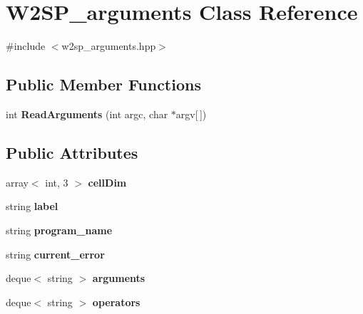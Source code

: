 \hypertarget{class_w2_s_p__arguments}{}\section{W2\+S\+P\+\_\+arguments Class Reference}
\label{class_w2_s_p__arguments}


{\ttfamily \#include $<$w2sp\+\_\+arguments.\+hpp$>$}

\subsection*{Public Member Functions}
\begin{DoxyCompactItemize}
\item 
int {\bfseries Read\+Arguments} (int argc, char $\ast$argv\mbox{[}$\,$\mbox{]})\hypertarget{class_w2_s_p__arguments_afe339aa7b9ece593138992383d0d7df2}{}\label{class_w2_s_p__arguments_afe339aa7b9ece593138992383d0d7df2}

\end{DoxyCompactItemize}
\subsection*{Public Attributes}
\begin{DoxyCompactItemize}
\item 
array$<$ int, 3 $>$ {\bfseries cell\+Dim}\hypertarget{class_w2_s_p__arguments_a46d91dbcde18e388672e5587bdb0e243}{}\label{class_w2_s_p__arguments_a46d91dbcde18e388672e5587bdb0e243}

\item 
string {\bfseries label}\hypertarget{class_w2_s_p__arguments_a8033248c369be266bec4f668264bf183}{}\label{class_w2_s_p__arguments_a8033248c369be266bec4f668264bf183}

\item 
string {\bfseries program\+\_\+name}\hypertarget{class_w2_s_p__arguments_a92f67e03c019035d66f6d74d592e121d}{}\label{class_w2_s_p__arguments_a92f67e03c019035d66f6d74d592e121d}

\item 
string {\bfseries current\+\_\+error}\hypertarget{class_w2_s_p__arguments_aa327835490b77458d1157f8a83b05ec3}{}\label{class_w2_s_p__arguments_aa327835490b77458d1157f8a83b05ec3}

\item 
deque$<$ string $>$ {\bfseries arguments}\hypertarget{class_w2_s_p__arguments_a95f44f50a04111000da2a893731d2437}{}\label{class_w2_s_p__arguments_a95f44f50a04111000da2a893731d2437}

\item 
deque$<$ string $>$ {\bfseries operators}\hypertarget{class_w2_s_p__arguments_a0ee2f27ace415c94334bc5a0211bd4ec}{}\label{class_w2_s_p__arguments_a0ee2f27ace415c94334bc5a0211bd4ec}

\end{DoxyCompactItemize}


